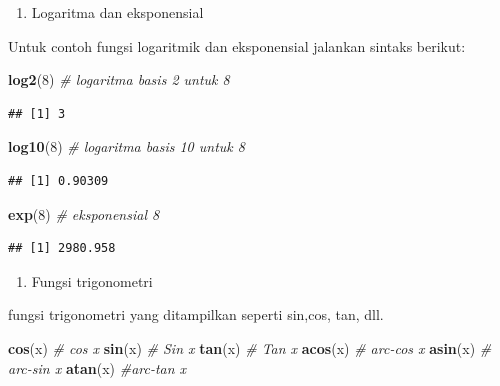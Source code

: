 \documentclass[]{book}
\newenvironment{Shaded}{\begin{snugshade}}{\end{snugshade}}
\newcommand{\CommentTok}[1]{\textcolor[rgb]{0.56,0.35,0.01}{\textit{#1}}}
\newcommand{\DecValTok}[1]{\textcolor[rgb]{0.00,0.00,0.81}{#1}}
\newcommand{\KeywordTok}[1]{\textcolor[rgb]{0.13,0.29,0.53}{\textbf{#1}}}
\newcommand{\NormalTok}[1]{#1}
\providecommand{\tightlist}{%
  \setlength{\itemsep}{0pt}\setlength{\parskip}{0pt}}
\theoremstyle{definition}
\theoremstyle{definition}
\theoremstyle{definition}
\theoremstyle{remark}
\begin{document}
\begin{enumerate}
\def\labelenumi{\arabic{enumi}.}
\tightlist
\item
  Logaritma dan eksponensial
\end{enumerate}

Untuk contoh fungsi logaritmik dan eksponensial jalankan sintaks berikut:

\begin{Shaded}
\begin{Highlighting}[]
\KeywordTok{log2}\NormalTok{(}\DecValTok{8}\NormalTok{) }\CommentTok{# logaritma basis 2 untuk 8}
\end{Highlighting}
\end{Shaded}

\begin{verbatim}
## [1] 3
\end{verbatim}

\begin{Shaded}
\begin{Highlighting}[]
\KeywordTok{log10}\NormalTok{(}\DecValTok{8}\NormalTok{) }\CommentTok{# logaritma basis 10 untuk 8}
\end{Highlighting}
\end{Shaded}

\begin{verbatim}
## [1] 0.90309
\end{verbatim}

\begin{Shaded}
\begin{Highlighting}[]
\KeywordTok{exp}\NormalTok{(}\DecValTok{8}\NormalTok{) }\CommentTok{# eksponensial 8}
\end{Highlighting}
\end{Shaded}

\begin{verbatim}
## [1] 2980.958
\end{verbatim}

\begin{enumerate}
\def\labelenumi{\arabic{enumi}.}
\setcounter{enumi}{1}
\tightlist
\item
  Fungsi trigonometri
\end{enumerate}

fungsi trigonometri yang ditampilkan seperti sin,cos, tan, dll.

\begin{Shaded}
\begin{Highlighting}[]
\KeywordTok{cos}\NormalTok{(x) }\CommentTok{# cos x}
\KeywordTok{sin}\NormalTok{(x) }\CommentTok{# Sin x}
\KeywordTok{tan}\NormalTok{(x) }\CommentTok{# Tan x}
\KeywordTok{acos}\NormalTok{(x) }\CommentTok{# arc-cos x}
\KeywordTok{asin}\NormalTok{(x) }\CommentTok{# arc-sin x}
\KeywordTok{atan}\NormalTok{(x) }\CommentTok{#arc-tan x}
\end{Highlighting}
\end{Shaded}
\end{document}
